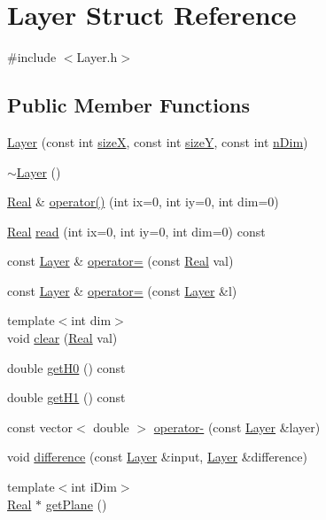 \hypertarget{struct_layer}{}\section{Layer Struct Reference}
\label{struct_layer}


{\ttfamily \#include $<$Layer.\+h$>$}

\subsection*{Public Member Functions}
\begin{DoxyCompactItemize}
\item 
\hyperlink{struct_layer_a61ced4ca9471c4a2188bb17cd9c8aa51}{Layer} (const int \hyperlink{struct_layer_a4904db3e1890920dd364930bb68efa07}{size\+X}, const int \hyperlink{struct_layer_a7ec60475ab6fdf004e5ed4be01b1a318}{size\+Y}, const int \hyperlink{struct_layer_ab937eda50c83c45e9bc814f6be6abb46}{n\+Dim})
\item 
\hyperlink{struct_layer_a1b1ba4804451dfe6cc357194e42762ae}{$\sim$\+Layer} ()
\item 
\hyperlink{_h_d_f5_dumper_8h_a445a5f0e2a34c9d97d69a3c2d1957907}{Real} \& \hyperlink{struct_layer_a733ff333403d1d8562316da0a24b1669}{operator()} (int ix=0, int iy=0, int dim=0)
\item 
\hyperlink{_h_d_f5_dumper_8h_a445a5f0e2a34c9d97d69a3c2d1957907}{Real} \hyperlink{struct_layer_aa31dc4e4f31fe67d08ca47c52fd3f16e}{read} (int ix=0, int iy=0, int dim=0) const 
\item 
const \hyperlink{struct_layer}{Layer} \& \hyperlink{struct_layer_a3313839c38d5a41930f4b5e197801242}{operator=} (const \hyperlink{_h_d_f5_dumper_8h_a445a5f0e2a34c9d97d69a3c2d1957907}{Real} val)
\item 
const \hyperlink{struct_layer}{Layer} \& \hyperlink{struct_layer_a4b09e4315b70058f14a70758b348aac9}{operator=} (const \hyperlink{struct_layer}{Layer} \&l)
\item 
{\footnotesize template$<$int dim$>$ }\\void \hyperlink{struct_layer_ac4a936af760f24859fcd890e173dfb49}{clear} (\hyperlink{_h_d_f5_dumper_8h_a445a5f0e2a34c9d97d69a3c2d1957907}{Real} val)
\item 
double \hyperlink{struct_layer_aa4a83091a6e4665cf421e35fc952bd1e}{get\+H0} () const 
\item 
double \hyperlink{struct_layer_a08e998684111b47031f8930ebde8d099}{get\+H1} () const 
\item 
const vector$<$ double $>$ \hyperlink{struct_layer_ab00a43d5c2cbe7d6344ad4d6cda77254}{operator-\/} (const \hyperlink{struct_layer}{Layer} \&layer)
\item 
void \hyperlink{struct_layer_a4bcab1de1c5e65873941c0e151c1e176}{difference} (const \hyperlink{struct_layer}{Layer} \&input, \hyperlink{struct_layer}{Layer} \&difference)
\item 
{\footnotesize template$<$int i\+Dim$>$ }\\\hyperlink{_h_d_f5_dumper_8h_a445a5f0e2a34c9d97d69a3c2d1957907}{Real} $\ast$ \hyperlink{struct_layer_a0be3e1cdc4ca169ac015fbdef58da93a}{get\+Plane} ()
\end{DoxyCompactItemize}
